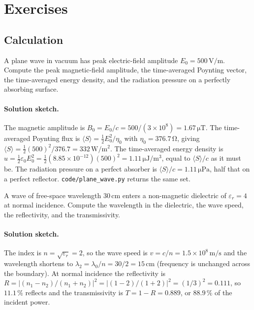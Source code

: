 \section{Exercises}

\subsection*{Calculation}

\begin{exercise}
A plane wave in vacuum has peak electric-field amplitude $E_{0} =
500\,\si{\volt\per\meter}$. Compute the peak magnetic-field amplitude,
the time-averaged Poynting vector, the time-averaged energy density,
and the radiation pressure on a perfectly absorbing surface.
\paragraph{Solution sketch.} The magnetic amplitude is $B_{0} = E_{0}/c
= 500/(3\times 10^{8}) = 1.67\,\si{\micro\tesla}$. The time-averaged
Poynting flux is $\langle S\rangle = \tfrac{1}{2}E_{0}^{2}/\eta_{0}$
with $\eta_{0} = 376.7\,\si{\ohm}$, giving $\langle S\rangle =
\tfrac{1}{2}(500)^{2}/376.7 = 332\,\si{\watt\per\meter\squared}$. The
time-averaged energy density is $u = \tfrac{1}{2}\varepsilon_{0}
E_{0}^{2} = \tfrac{1}{2}(8.85\times 10^{-12})(500)^{2} = 1.11\,\si{
\micro\joule\per\meter\cubed}$, equal to $\langle S\rangle/c$ as it
must be. The radiation pressure on a perfect absorber is $\langle
S\rangle/c = 1.11\,\si{\micro\pascal}$, half that on a perfect
reflector. \texttt{code/plane\_wave.py} returns the same set.
\end{exercise}

\begin{exercise}
A wave of free-space wavelength $30\,\si{\centi\meter}$ enters a
non-magnetic dielectric of $\varepsilon_{r} = 4$ at normal incidence.
Compute the wavelength in the dielectric, the wave speed, the
reflectivity, and the transmissivity.
\paragraph{Solution sketch.} The index is $n = \sqrt{\varepsilon_{r}} =
2$, so the wave speed is $v = c/n = 1.5\times 10^{8}\,\si{\meter\per
\second}$ and the wavelength shortens to $\lambda_{2} = \lambda_{0}/n =
30/2 = 15\,\si{\centi\meter}$ (frequency is unchanged across the
boundary). At normal incidence the reflectivity is $R = |(n_{1}-n_{2})/
(n_{1}+n_{2})|^{2} = |(1-2)/(1+2)|^{2} = (1/3)^{2} = 0.111$, so $11.1\,
\%$ reflects and the transmissivity is $T = 1 - R = 0.889$, or $88.9\,
\%$ of the incident power.
\end{exercise}


